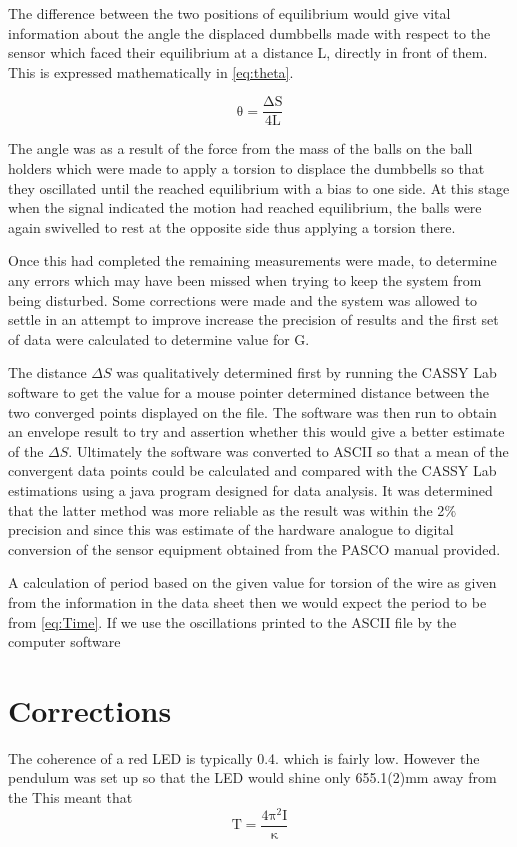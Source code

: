\documentclass[12pt]{article}
\begin{document}
The difference between the two positions of equilibrium would give vital information about the angle the displaced dumbbells made with respect to the sensor which faced their equilibrium at a distance L, directly in front of them. This is expressed mathematically in \cref{eq:theta}.

\begin{equation}
\label{eq:theta}
\mathrm{\theta = \frac{\Delta S }{4L}}
\end{equation}

 

The angle was as a result of the force from the mass of the balls on the ball holders which were made to apply a torsion to displace the dumbbells so that they oscillated until the reached equilibrium with a bias to one side. At this stage when the signal indicated the motion had reached equilibrium, the balls were again swivelled to rest at the opposite side thus applying a torsion there. 

Once this had completed the remaining measurements were made, to determine any errors which may have been missed when trying to keep the system from being disturbed. Some corrections were made and the system was allowed to settle in an attempt to improve increase the precision of results and the first set of data were calculated to determine value for G. 

The distance  $\Delta S$ was qualitatively determined first by running the CASSY Lab software to get the value for a mouse pointer determined distance between the two converged points displayed on the file. The software was then run to obtain an envelope result to try and assertion whether this would give a better estimate of the $\Delta S$. Ultimately the software was converted to ASCII so that a mean of the convergent data points could be calculated and compared with the CASSY Lab estimations using a java program designed for data analysis\cite{me}. It was determined that the latter method was more reliable as the result was within the 2$\%$ precision and since this was estimate of the hardware analogue to digital conversion of the sensor equipment  obtained from the PASCO manual provided.

A calculation of period based on the given value for torsion of the wire as given from the information in the data sheet then we would expect the period to be  from \cref{eq:Time}. If we use the oscillations printed to the ASCII  file by the computer software  
\section*{Corrections}
The coherence of a red LED is typically 0.4.\cite{red} which is fairly low. However the pendulum was set up so that the LED would shine only  655.1(2)mm away from the This meant that 
\begin{equation}
\label{eq:Time}
\mathrm{T = \frac{4\pi^2 I}{\kappa}}
\end{equation}
%
%
\end{document}
